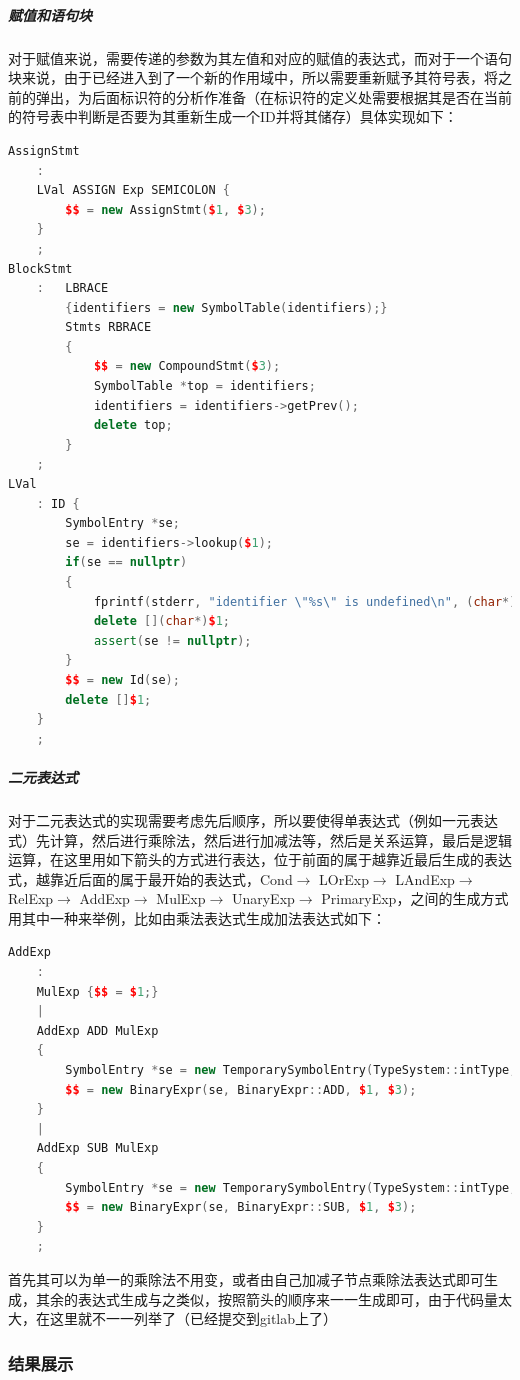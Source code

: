 \documentclass[UTF8,a4paper,10pt]{ctexart}
\begin{document}
\subparagraph{赋值和语句块}
对于赋值来说，需要传递的参数为其左值和对应的赋值的表达式，而对于一个语句块来说，由于已经进入到了一个新的作用域中，所以需要重新赋予其符号表，将之前的弹出，为后面标识符的分析作准备（在标识符的定义处需要根据其是否在当前的符号表中判断是否要为其重新生成一个ID并将其储存）具体实现如下：
\begin{lstlisting}[title = 赋值和语句块, language = c++]
AssignStmt
    :
    LVal ASSIGN Exp SEMICOLON {
        $$ = new AssignStmt($1, $3);
    }
    ;
BlockStmt
    :   LBRACE 
        {identifiers = new SymbolTable(identifiers);} 
        Stmts RBRACE 
        {
            $$ = new CompoundStmt($3);
            SymbolTable *top = identifiers;
            identifiers = identifiers->getPrev();
            delete top;
        }
    ;
LVal
    : ID {
        SymbolEntry *se;
        se = identifiers->lookup($1);
        if(se == nullptr)
        {
            fprintf(stderr, "identifier \"%s\" is undefined\n", (char*)$1);
            delete [](char*)$1;
            assert(se != nullptr);
        }
        $$ = new Id(se);
        delete []$1;
    }
    ;
\end{lstlisting}


\subparagraph{二元表达式}
对于二元表达式的实现需要考虑先后顺序，所以要使得单表达式（例如一元表达式）先计算，然后进行乘除法，然后进行加减法等，然后是关系运算，最后是逻辑运算，在这里用如下箭头的方式进行表达，位于前面的属于越靠近最后生成的表达式，越靠近后面的属于最开始的表达式，Cond$\rightarrow$
LOrExp$\rightarrow$
LAndExp$\rightarrow$
RelExp$\rightarrow$
AddExp$\rightarrow$
MulExp$\rightarrow$
UnaryExp$\rightarrow$
PrimaryExp，之间的生成方式用其中一种来举例，比如由乘法表达式生成加法表达式如下：
\begin{lstlisting}[title = 乘法到加法, language = c++]
AddExp
    :
    MulExp {$$ = $1;}
    |
    AddExp ADD MulExp
    {
        SymbolEntry *se = new TemporarySymbolEntry(TypeSystem::intType, SymbolTable::getLabel());
        $$ = new BinaryExpr(se, BinaryExpr::ADD, $1, $3);
    }
    |
    AddExp SUB MulExp
    {
        SymbolEntry *se = new TemporarySymbolEntry(TypeSystem::intType, SymbolTable::getLabel());
        $$ = new BinaryExpr(se, BinaryExpr::SUB, $1, $3);
    }
    ;
\end{lstlisting}
首先其可以为单一的乘除法不用变，或者由自己加减子节点乘除法表达式即可生成，其余的表达式生成与之类似，按照箭头的顺序来一一生成即可，由于代码量太大，在这里就不一一列举了（已经提交到gitlab上了）

\subsubsection{结果展示}
\end{document}

